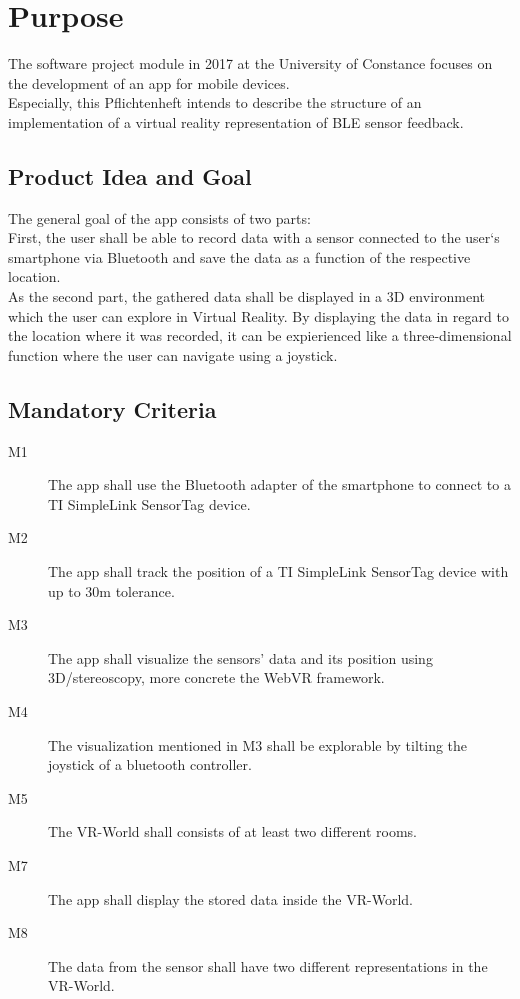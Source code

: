 \section{Purpose}
The software project module in 2017 at the University of Constance focuses on the development of an app for mobile devices. \\
Especially, this Pflichtenheft intends to describe the structure of an implementation of a virtual reality representation of BLE sensor feedback.

\subsection{Product Idea and Goal}
The general goal of the app consists of two parts: \\
First, the user shall be able to record data with a sensor connected to the user`s smartphone via Bluetooth and save the data as a function of the respective location. \\
As the second part, the gathered data shall be displayed in a 3D environment which the user can explore in Virtual Reality. By displaying the data in regard to the location where it was recorded, it can be expierienced like a three-dimensional function where the user can navigate using a joystick.


\subsection{Mandatory Criteria}

\begin{description}
  \item[M1] The app shall use the Bluetooth adapter of the smartphone to connect to a TI SimpleLink SensorTag device.
  \item[M2] The app shall track the position of a TI SimpleLink SensorTag device with up to 30m tolerance.
  \item[M3] The app shall visualize the sensors' data and its position using 3D/stereoscopy, more concrete the WebVR framework.
  \item[M4] The visualization mentioned in M3 shall be explorable by tilting the joystick of a bluetooth controller.
  \item[M5] The VR-World shall consists of at least two different rooms.
  \item[M7] The app shall display the stored data inside the VR-World.
  \item[M8] The data from the sensor shall have two different representations in the VR-World.
\end{description}

